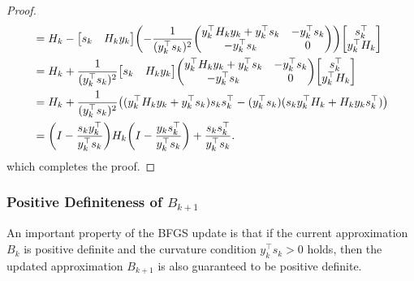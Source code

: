 \documentclass[0_en]{subfiles}
\begin{document}
\begin{proof}
\begin{align*}
                & = H_k- \mqty[s_k                                                                                                                             & H_k y_k]\qty(-\frac{1}{(y_k^\top s_k)^2}\mqty(y_k^\top H_k y_k + y_k^\top s_k & -y_k^\top s_k \\-y_k^\top s_k                 & 0    )) \mqty[ s_k^\top                                                      \\     y_k^\top H_k]  \\
                & = H_k+\frac{1}{(y_k^\top s_k)^2}\mqty[s_k                                                                                                    & H_k y_k] \mqty(y_k^\top H_k y_k + y_k^\top s_k                                & -y_k^\top s_k \\-y_k^\top s_k                 & 0) \mqty[s_k^\top                                                             \\    y_k^\top H_k]\\
                & = H_k+\frac{1}{(y_k^\top s_k)^2} \qty((y_k^\top H_k y_k + y_k^\top s_k) s_k s_k^\top - (y_k^\top s_k)(s_k y_k^\top H_k + H_k y_k s_k^\top) )                                                                                                 \\
                & = \qty(I - \frac{s_k y_k^\top}{y_k^\top s_k}) H_k \qty(I - \frac{y_k s_k^\top}{y_k^\top s_k}) + \frac{s_k s_k^\top}{y_k^\top s_k}.
    \end{align*}
    which completes the proof.
\end{proof}

\subsubsection{Positive Definiteness of \texorpdfstring{$B_{k+1}$}{Bk+1}}

An important property of the BFGS update is that if the current approximation $B_k$ is positive definite and the curvature condition $y_k^\top s_k > 0$ holds, then the updated approximation $B_{k+1}$ is also guaranteed to be positive definite.
\end{document}
